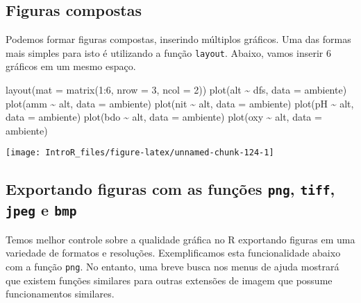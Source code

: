 \documentclass[
]{book}
\newenvironment{Shaded}{\begin{snugshade}}{\end{snugshade}}
\newcommand{\AttributeTok}[1]{\textcolor[rgb]{0.77,0.63,0.00}{#1}}
\newcommand{\DecValTok}[1]{\textcolor[rgb]{0.00,0.00,0.81}{#1}}
\newcommand{\FunctionTok}[1]{\textcolor[rgb]{0.00,0.00,0.00}{#1}}
\newcommand{\NormalTok}[1]{#1}
\newcommand{\SpecialCharTok}[1]{\textcolor[rgb]{0.00,0.00,0.00}{#1}}
\begin{document}
\hypertarget{figuras-compostas}{%
\subsection{Figuras compostas}\label{figuras-compostas}}

Podemos formar figuras compostas, inserindo múltiplos gráficos. Uma das formas mais simples para isto é utilizando a função \texttt{layout}. Abaixo, vamos inserir 6 gráficos em um mesmo espaço.

\begin{Shaded}
\begin{Highlighting}[]
\FunctionTok{layout}\NormalTok{(}\AttributeTok{mat =} \FunctionTok{matrix}\NormalTok{(}\DecValTok{1}\SpecialCharTok{:}\DecValTok{6}\NormalTok{, }\AttributeTok{nrow =} \DecValTok{3}\NormalTok{, }\AttributeTok{ncol =} \DecValTok{2}\NormalTok{))}
\FunctionTok{plot}\NormalTok{(alt }\SpecialCharTok{\textasciitilde{}}\NormalTok{ dfs, }\AttributeTok{data =}\NormalTok{ ambiente)}
\FunctionTok{plot}\NormalTok{(amm }\SpecialCharTok{\textasciitilde{}}\NormalTok{ alt, }\AttributeTok{data =}\NormalTok{ ambiente)}
\FunctionTok{plot}\NormalTok{(nit }\SpecialCharTok{\textasciitilde{}}\NormalTok{ alt, }\AttributeTok{data =}\NormalTok{ ambiente)}
\FunctionTok{plot}\NormalTok{(pH }\SpecialCharTok{\textasciitilde{}}\NormalTok{ alt, }\AttributeTok{data =}\NormalTok{ ambiente)}
\FunctionTok{plot}\NormalTok{(bdo }\SpecialCharTok{\textasciitilde{}}\NormalTok{ alt, }\AttributeTok{data =}\NormalTok{ ambiente)}
\FunctionTok{plot}\NormalTok{(oxy }\SpecialCharTok{\textasciitilde{}}\NormalTok{ alt, }\AttributeTok{data =}\NormalTok{ ambiente)}
\end{Highlighting}
\end{Shaded}

\begin{center}\texttt{[image: IntroR\_files/figure-latex/unnamed-chunk-124-1]} \end{center}

\hypertarget{exportando-figuras-com-as-funuxe7uxf5es-png-tiff-jpeg-e-bmp}{%
\subsection{\texorpdfstring{Exportando figuras com as funções \texttt{png}, \texttt{tiff}, \texttt{jpeg} e \texttt{bmp}}{Exportando figuras com as funções png, tiff, jpeg e bmp}}\label{exportando-figuras-com-as-funuxe7uxf5es-png-tiff-jpeg-e-bmp}}

Temos melhor controle sobre a qualidade gráfica no R exportando figuras em uma variedade de formatos e resoluções. Exemplificamos esta funcionalidade abaixo com a função \texttt{png}. No entanto, uma breve busca nos menus de ajuda mostrará que existem funções similares para outras extensões de imagem que possume funcionamentos similares.
\end{document}
